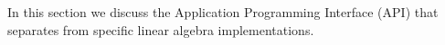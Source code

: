 In this section we discuss the Application Programming Interface (API) that separates \mloo from specific linear
algebra implementations.

